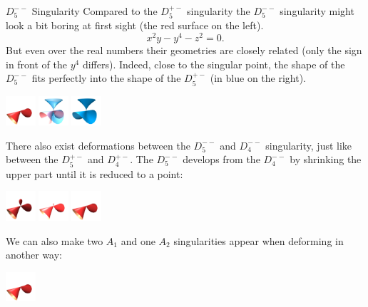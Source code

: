 \begin{surferPage}[D5-- Singularity]{$D_5^{--}$ Singularity}
	Compared to the $D_5^{+-}$ singularity the $D_5^{--}$ singularity might look a bit boring at first sight (the red surface on the left).
	\[
		x^2y-y^4-z^2=0.
	\]
	But even over the real numbers their geometries are closely related (only the sign in front of the $y^4$ differs). Indeed, close to the singular point, the shape of the $D_5^{--}$ fits perfectly into the shape of the $D_5^{+-}$ (in blue on the right).
	\begin{Centering*}%
		\includegraphics[width=1.1cm]{../../common/images/D5mm_01}\quad%
		\includegraphics[width=1.1cm]{../../common/images/D5pm_D5mm}\quad%
		\includegraphics[width=1.1cm]{../../common/images/D5pm_blue}%
	\end{Centering*}
	There also exist deformations between the $D_5^{--}$ and $D_4^{--}$ singularity, just like between the $D_5^{+-}$ and $D_4^{+-}$. The $D_5^{--}$ develops from the $D_4^{--}$ by shrinking the upper part until it is reduced to a point:
	\begin{Centering*}%
		\includegraphics[width=1.1cm]{../../common/images/D5mm_03}\quad%
		\includegraphics[width=1.1cm]{../../common/images/D5mm_02}\quad%
		\includegraphics[width=1.1cm]{../../common/images/D5mm_01}%
	\end{Centering*}
	We can also make two $A_1$ and one $A_2$ singularities appear when deforming in another way:
	\begin{Centering*}%
		\includegraphics[width=1.1cm]{../../common/images/D5mm_01}\quad%

\end{Centering*}
\end{surferPage}
